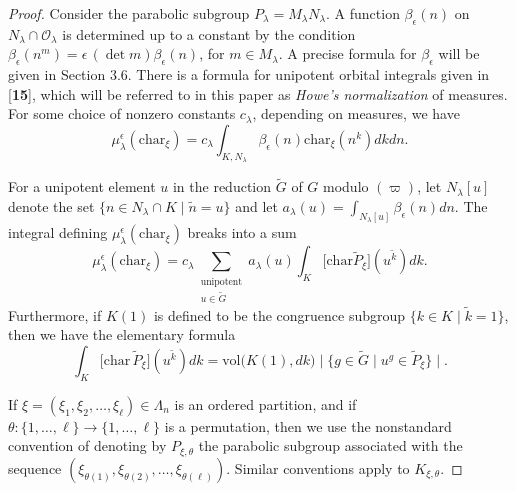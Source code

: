 \documentclass{amsart}
\begin{document}
\begin{proof}
Consider the parabolic subgroup
  $P_{\lambda} = M_{\lambda} N_{\lambda} $.
A function 
  $ \beta_{\epsilon} (n) $ on
  $ N_{\lambda} \cap {\mathcal O}  _{\lambda} $ is
determined up to a constant by the condition
  $ \beta_{\epsilon} (n^m) =
    \epsilon \, (\det m) 
    \beta_{\epsilon} (n)$, for
  $ m \in M_{\lambda} $.
A precise formula for 
  $ \beta_{\epsilon} $
will be given in Section 3.6.
There is a formula for unipotent orbital integrals
given in [{\bf 15}], which will be referred to
in this paper as {\it Howe's normalization} of measures.
For some choice of nonzero constants 
  $ c_{\lambda} $,
depending on measures, we have
%
$$
  \mu_{\lambda}^{\epsilon}
  (\text{char}_{\xi}) =
  c_{\lambda}
  \int_{K,N_{\lambda}} 
  \beta_{\epsilon} (n) 
  \text{char}_{\xi} (n^k) dkdn.
$$

For a unipotent element $u$ in the reduction $\tilde G$ of $G$ modulo $(\varpi)$,
let
  $ N_{\lambda} [u]$ denote the set  
    $\{ n \in N_{\lambda} \cap K \mid \tilde n = u \} $
and let 
  $ a_{\lambda} (u) = \int_{N_{\lambda}[u]}
    \beta_{\epsilon} (n) dn $.
The integral defining $\mu^\epsilon_\lambda(\text{char}_\xi)$ breaks
into a sum
%
$$
  \mu_{\lambda}^{\epsilon} (\text{char}_{\xi}) =
  c_{\lambda}
  \sum_{\substack{
     \text{unipotent} \\
     u \in \tilde G}}
  a_{\lambda} (u)
  \int_K
  \bigl[
     \text{char}
     \tilde P_{\xi}
  \bigr]
  (u^{\tilde k}) dk.
$$
%
Furthermore, if $K(1)$ is defined to be the congruence subgroup
$\{k\in K\mid \tilde k=1\}$, then we have the elementary formula
%
$$
  \int_K
  \bigl[
    \text{char}\,\tilde P_\xi
  \bigr]
  ( u^{\tilde k})
  dk =
  \text{vol}
  \bigl(
    K(1), dk
  \bigr)
 \mid 
  \{
    g \in \tilde G \mid u^g \in \tilde P_{\xi}
  \}\mid.
$$

If
  $ \xi = (\xi_1, \xi_2, \dots ,\xi_{\ell} ) \in\Lambda_n$ is an
  ordered partition,
and if
  $ \theta: \{ 1, \dots , \ell \} \to
    \{ 1, \dots , \ell \} $
is a permutation, then we use the nonstandard convention of denoting by
  $ P_{\xi, \theta} $
the parabolic subgroup associated with the sequence
  $ (\xi_{\theta(1)},
     \xi_{\theta(2)}, \dots ,
     \xi_{\theta(\ell)} ) $.
Similar conventions apply to 
  $ K_{\xi,\theta} $.


\end{proof}
\end{document}
